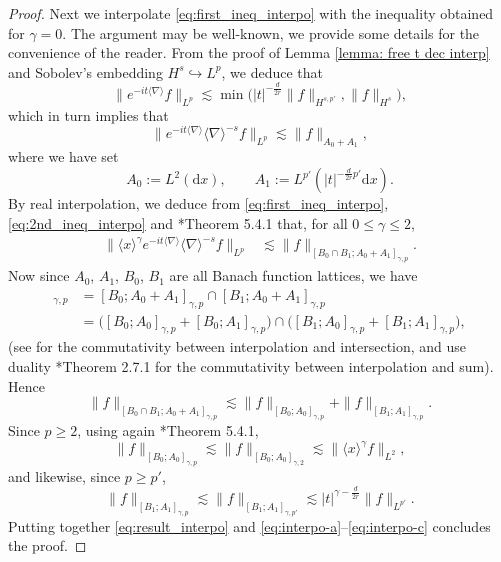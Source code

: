 \documentclass[12pt]{article}
\theoremstyle{plain}
\begin{document}
\begin{proof}
Next we interpolate \eqref{eq:first_ineq_interpo} with the inequality obtained for $\gamma=0$. The argument may be well-known, we provide some details for the convenience of the reader. From the proof of Lemma \ref{lemma: free t dec interp} and Sobolev's embedding $H^s\hookrightarrow L^p$, we deduce that 
		\begin{equation*}
			\|e^{-it\langle \nabla \rangle} f\|_{L^{p}} \lesssim \min\big( |t|^{-\frac{d}{2r}}\| f\|_{H^{s,p'}} , \|f\|_{H^s}\big),
		\end{equation*}
which in turn implies that
\begin{equation}\label{eq:2nd_ineq_interpo}
			\|e^{-it\langle \nabla \rangle}\langle\nabla\rangle^{-s} f\|_{L^{p}} \lesssim \|f\|_{A_0+A_1},
		\end{equation}
where we have set
\begin{equation*}
    A_0:=L^2(\mathrm{d}x),\qquad A_1:=L^{p'}(| t|^{-\frac{d}{2r}p'}\mathrm{d}x).
\end{equation*}
By real interpolation, we deduce from \eqref{eq:first_ineq_interpo}, \eqref{eq:2nd_ineq_interpo} and \cite{bergh_lofstrom}*{Theorem 5.4.1} that, for all $0\le\gamma\le2$,
\begin{align}\label{eq:result_interpo}
        \big\|\langle x\rangle^\gamma e^{-it\langle\nabla\rangle}\langle\nabla\rangle^{-s}f\big\|_{L^p}&\lesssim \|f\|_{[B_0\cap B_1;A_0+A_1]_{\gamma,p}}.
\end{align}
Now since $A_0$, $A_1$, $B_0$, $B_1$ are all Banach function lattices, we have
\begin{align*}
    [B_0\cap B_1;A_0+A_1]_{\gamma,p}&=[B_0;A_0+A_1]_{\gamma,p}\cap [B_1;A_0+A_1]_{\gamma,p}\\
    &=\big([B_0;A_0]_{\gamma,p}+[B_0;A_1]_{\gamma,p}\big)\cap \big([B_1;A_0]_{\gamma,p}+[B_1;A_1]_{\gamma,p}\big),
\end{align*}
(see \cite{Maligranda} for the commutativity between interpolation and intersection, and use duality \cite{bergh_lofstrom}*{Theorem 2.7.1} for the commutativity between interpolation and sum). Hence
\begin{equation}
    \|f\|_{[B_0\cap B_1;A_0+A_1]_{\gamma,p}}\lesssim \|f\|_{[B_0;A_0]_{\gamma,p}}+\|f\|_{[B_1;A_1]_{\gamma,p}}. \label{eq:interpo-a}
\end{equation}
Since $p\ge2$, using again \cite{bergh_lofstrom}*{Theorem 5.4.1},
\begin{equation}
    \|f\|_{[B_0;A_0]_{\gamma,p}}\lesssim\|f\|_{[B_0;A_0]_{\gamma,2}}\lesssim\|\langle x\rangle^\gamma f\|_{L^2}, \label{eq:interpo-b}
\end{equation}
and likewise, since $p\ge p'$,
\begin{equation}
    \|f\|_{[B_1;A_1]_{\gamma,p}}\lesssim\|f\|_{[B_1;A_1]_{\gamma,p'}}\lesssim|t|^{\gamma-\frac{d}{2r}}\|f\|_{L^{p'}}.\label{eq:interpo-c}
\end{equation} 
Putting together \eqref{eq:result_interpo} and \eqref{eq:interpo-a}--\eqref{eq:interpo-c} concludes the proof.
\end{proof}
	
	\doclicenseThis
\end{document}
